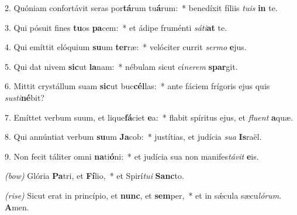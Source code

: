 2. Quóniam confortávit seras por\textbf{tá}\-rum tu\textbf{á}rum:~*
	benedíxit fíliis \textit{tu}\textit{is} \textbf{in} te.

3. Qui pósuit fines \textbf{tu}os \textbf{pa}cem:~*
	et ádipe fruménti \textit{sá}\textit{ti}\textbf{at} te.

4. Qui emíttit elóquium \textbf{su}um \textbf{ter}ræ:~*
	velóciter currit \textit{ser}\textit{mo} \textbf{e}jus.

5. Qui dat nivem \textbf{sic}ut \textbf{la}nam:~*
	nébulam sicut cí\textit{ne}\textit{rem} \textbf{spar}git.

6. Mittit crystállum suam \textbf{sic}ut buc\textbf{cél}las:~*
	ante fáciem frígoris ejus quis \textit{sus}\textit{ti}\textbf{né}bit?

7. Emíttet verbum suum, et lique\textbf{fá}ciet \textbf{e}a:~*
	flabit spíritus ejus, et \textit{flu}\textit{ent} \textbf{a}quæ.

8. Qui annúntiat verbum \textbf{su}um \textbf{Ja}cob:~*
	justítias, et judícia \textit{su}\textit{a} \textbf{Is}raël.

9. Non fecit táliter omni \textbf{na}ti\textbf{ó}ni:~*
	et judícia sua non manifes\textit{tá}\textit{vit} \textbf{e}is.

\textit{(bow)} Glória \textbf{Pa}tri, et \textbf{Fí}lio,~*
	et Spirí\textit{tu}\textit{i} \textbf{Sanc}to.

\textit{(rise)} Sicut erat in princípio, et \textbf{nunc}, et \textbf{sem}per,~*
	et in s\'{\ae}cula sæcu\textit{ló}\textit{rum}. \textbf{A}men.